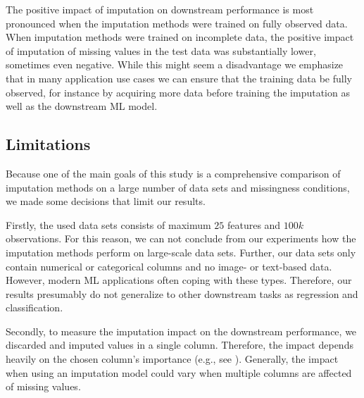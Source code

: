 The positive impact of imputation on downstream performance is most pronounced when the imputation methods were trained on fully observed data. When imputation methods were trained on incomplete data, the positive impact of imputation of missing values in the test data was substantially lower, sometimes even negative. While this might seem a disadvantage we emphasize that in many application use cases we can ensure that the training data be fully observed, for instance by acquiring more data before training the imputation as well as the downstream ML model.


\subsection{Limitations}
%
Because one of the main goals of this study is a comprehensive comparison of imputation methods on a large number of data sets and missingness conditions, we made some decisions that limit our results.

Firstly, the used data sets consists of maximum $25$ features and $100k$ observations. For this reason, we can not conclude from our experiments how the imputation methods perform on large-scale data sets. Further, our data sets only contain numerical or categorical columns and no image- or text-based data. However, modern ML applications often coping with these types. Therefore, our results presumably do not generalize to other downstream tasks as regression and classification.

Secondly, to measure the imputation impact on the downstream performance, we discarded and imputed values in a single column. Therefore, the impact depends heavily on the chosen column's importance (e.g., see \cite{Jenga}). Generally, the impact when using an imputation model could vary when multiple columns are affected of missing values.
